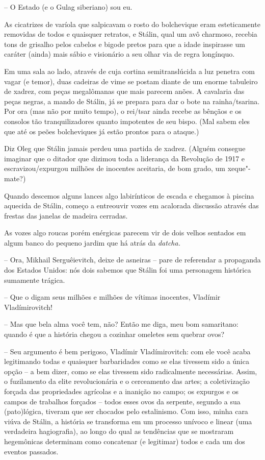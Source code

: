 -- O Estado (e o Gulag siberiano) sou eu.

As cicatrizes de varíola que salpicavam o rosto do bolchevique eram
esteticamente removidas de todos e quaisquer retratos, e Stálin, qual um
avô charmoso, recebia tons de grisalho pelos cabelos e bigode pretos
para que a idade inspirasse um caráter (ainda) mais sábio e visionário a
seu olhar via de regra longínquo.

Em uma sala ao lado, através de cuja cortina semitranslúcida a luz
penetra com vagar (e temor), duas cadeiras de vime se postam diante de
um enorme tabuleiro de xadrez, com peças megalômanas que mais parecem
anões. A cavalaria das peças negras, a mando de Stálin, já se prepara
para dar o bote na rainha/tsarina. Por ora (mas não por muito tempo), o
rei/tsar ainda recebe as bênçãos e os consolos tão tranquilizadores
quanto impotentes de seu bispo. (Mal sabem eles que até os peões
bolcheviques já estão prontos para o ataque.)

Diz Oleg que Stálin jamais perdeu uma partida de xadrez. (Alguém
consegue imaginar que o ditador que dizimou toda a liderança da
Revolução de 1917 e escravizou/expurgou milhões de inocentes aceitaria,
de bom grado, um xeque"-mate?)

Quando descemos alguns lances algo labirínticos de escada e chegamos à
piscina aquecida de Stálin, começo a entreouvir vozes em acalorada
discussão através das frestas das janelas de madeira cerradas.

As vozes algo roucas porém enérgicas parecem vir de dois velhos sentados
em algum banco do pequeno jardim que há atrás da \emph{datcha. }

-- Ora, Mikhail Serguêievitch, deixe de asneiras -- pare de referendar a
propaganda dos Estados Unidos: nós dois sabemos que Stálin foi uma
personagem histórica sumamente trágica.

-- Que o digam seus milhões e milhões de vítimas inocentes, Vladímir
Vladímirovitch!

-- Mas que bela alma você tem, não? Então me diga, meu bom samaritano:
quando é que a história chegou a cozinhar omeletes sem quebrar ovos?

-- Seu argumento é bem perigoso, Vladímir Vladímirovitch: com ele você
acaba legitimando todas e quaisquer barbaridades como se elas tivessem
sido a única opção -- a bem dizer, como se elas tivessem sido
radicalmente necessárias. Assim, o fuzilamento da elite revolucionária e
o cerceamento das artes; a coletivização forçada das propriedades
agrícolas e a inanição no campo; os expurgos e os campos de trabalhos
forçados -- todos esses ovos da serpente, segundo a sua (pato)lógica,
tiveram que ser chocados pelo estalinismo. Com isso, minha cara viúva de
Stálin, a história se transforma em um processo unívoco e linear (uma
verdadeira hagiografia), ao longo do qual as tendências que se mostraram
hegemônicas determinam como concatenar (e legitimar) todos e cada um dos
eventos passados.

